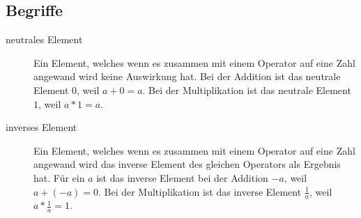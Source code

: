 \documentclass{article}
\begin{document}
\subsection{Begriffe}
\begin{description}
 \item[neutrales Element] Ein Element, welches wenn es zusammen mit einem Operator auf eine Zahl angewand wird keine Auswirkung hat. Bei der Addition ist das neutrale Element $0$, weil $a+0=a$. Bei der Multiplikation ist das neutrale Element $1$, weil $a*1=a$.
 \item[inverses Element] Ein Element, welches wenn es zusammen mit einem Operator auf eine Zahl angewand wird das inverse Element des gleichen Operators als Ergebnis hat. Für ein $a$ ist das inverse Element bei der Addition $-a$, weil $a+(-a)=0$. Bei der Multiplikation ist das inverse Element $\tfrac{1}{a}$, weil $a*\tfrac{1}{a}=1$.
\end{description}
\end{document}
